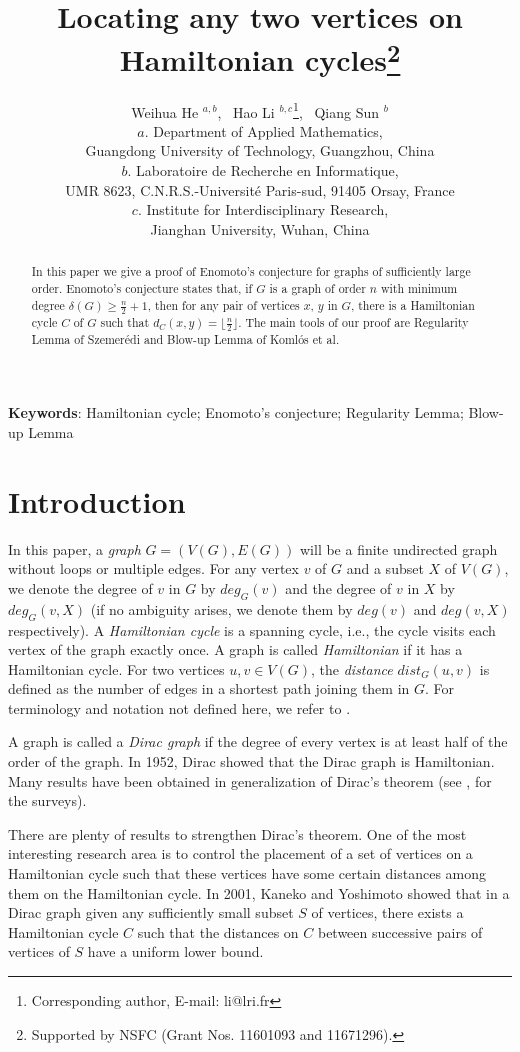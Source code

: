 \documentclass[11pt]{article}
\title{Locating any two vertices on Hamiltonian cycles{\footnote {Supported by NSFC (Grant Nos. 11601093 and 11671296).}}}
\author{Weihua He $^{a,b}$,~ Hao Li $^{b,c}${\footnote {Corresponding author, E-mail:
li@lri.fr}},~ Qiang Sun $^{b}$\\ {\small $a.$ Department of Applied Mathematics,}\\ {\small Guangdong University of Technology, Guangzhou, China}\\ {\small $b.$ Laboratoire de Recherche
en Informatique,}\\ \small {UMR 8623, C.N.R.S.-Universit\'e Paris-sud, 91405 Orsay, France}\\
\mbox{}\hspace{0.15cm}\small {$c.$ Institute for Interdisciplinary Research,}\\
\small {Jianghan University, Wuhan, China}
}
\date{}
\begin{document}
\maketitle

\begin{abstract}
In this paper we give a proof of Enomoto's conjecture for graphs of sufficiently large order. Enomoto's conjecture states that, if $G$ is a graph of order $n$ with minimum degree $\delta(G)\geq \frac{n}{2}+1$, then for any pair of vertices $x$, $y$ in $G$, there is a Hamiltonian cycle $C$ of $G$ such that $d_C(x,y)=\lfloor \frac{n}{2}\rfloor$. The main tools of our proof are Regularity Lemma of Szemer\'{e}di and Blow-up Lemma of Koml\'{o}s et al.
\end{abstract}

{\bf Keywords}: Hamiltonian cycle; Enomoto's conjecture; Regularity Lemma; Blow-up Lemma


\section{Introduction}

In this paper, a {\em graph} $G=(V(G),E(G))$ will be a finite undirected graph without loops or multiple edges. For any vertex $v$ of $G$ and a subset $X$ of $V(G)$, we denote the degree of $v$ in $G$ by $deg_G(v)$ and the degree of $v$ in $X$ by $deg_G(v,X)$ (if no ambiguity arises, we denote them by $deg(v)$ and $deg(v,X)$ respectively). A {\em Hamiltonian cycle} is a spanning cycle, i.e., the cycle visits each vertex of the graph exactly once. A graph is called {\em Hamiltonian} if it has a Hamiltonian cycle. For two vertices $u,v\in V(G)$, the {\em distance} $dist_G(u,v)$ is defined as the number of edges in a shortest path joining them in $G$. For terminology and notation not defined here, we refer to \cite{bondy}.

A graph is called a {\em Dirac graph} if the degree of every vertex is at least half of the order of the graph. In 1952, Dirac showed that the Dirac graph is Hamiltonian. Many results have been obtained in generalization of Dirac's theorem (see \cite{gouldsurvey}, \cite{dirac} for the surveys).

There are plenty of results to strengthen Dirac's theorem. One of the most interesting research area is to control the placement of a set of vertices on a Hamiltonian cycle such that these vertices have some certain distances among them on the Hamiltonian cycle. In 2001, Kaneko and Yoshimoto \cite{kaneko} showed that in a Dirac graph given any sufficiently small subset $S$ of vertices, there exists a Hamiltonian cycle $C$ such that the distances on $C$ between successive pairs of vertices of $S$ have a uniform lower bound.
\end{document}
